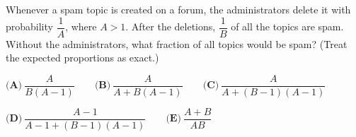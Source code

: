 Whenever a spam topic is created on a forum, the administrators delete it with probability $\dfrac{1}{A}$, where $A>1$. After the deletions, $\dfrac{1}{B}$ of all the topics are spam. Without the administrators, what fraction of all topics would be spam? (Treat the expected proportions as exact.)

$\textbf{(A)}\ \dfrac{A}{B(A-1)}\qquad\textbf{(B)}\ \dfrac{A}{A+B(A-1)}\qquad\textbf{(C)}\ \dfrac{A}{A+(B-1)(A-1)}$

$\textbf{(D)}\ \dfrac{A-1}{A-1+(B-1)(A-1)}\qquad\textbf{(E)}\ \dfrac{A+B}{AB}$
